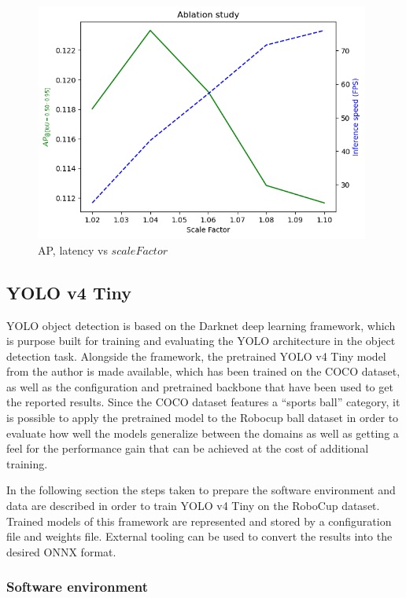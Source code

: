 \documentclass[a4paper,twoside,12pt]{report}
\begin{document}
\begin{figure}[h!]
\begin{center}
\includegraphics[width=11cm]{images/vj_ablation.png}
\caption{AP, latency vs $scaleFactor$}
\label{fig:vjspeeds}
\end{center}
\end{figure}

\subsection{YOLO v4 Tiny}

YOLO object detection is based on the Darknet deep learning framework, which is purpose built for training and evaluating the YOLO architecture in the object detection task. Alongside the framework, the pretrained YOLO v4 Tiny \citep{yolov4tiny} model from the author is made available, which has been trained on the COCO dataset, as well as the configuration and pretrained backbone that have been used to get the reported results. Since the COCO dataset features a ``sports ball'' category, it is possible to apply the pretrained model to the Robocup ball dataset in order to evaluate how well the models generalize between the domains as well as getting a feel for the performance gain that can be achieved at the cost of additional training.

In the following section the steps taken to prepare the software environment and data are described in order to train YOLO v4 Tiny on the RoboCup dataset. Trained models of this framework are represented and stored by a configuration file and weights file. External tooling can be used to convert the results into the desired ONNX format. 

\subsubsection{Software environment}
\end{document}

